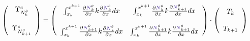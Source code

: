 \[
\left(
\begin{array}{cc}
 {\Upsilon}_{N_k^\theta}^e \\ \\ {\Upsilon}_{N_{k+1}^\theta}^e
\end{array}
\right)
=
\left(
\begin{array}{cc}
\int_{x_k}^{x^{k+1}} \frac{\partial {\color{Violet}N}_k^\theta}{\partial x} k \frac{\partial  {\color{Violet}N}_{k}^\theta } {\partial x}  dx & 
\int_{x_k}^{x^{k+1}} \frac{\partial {\color{Violet}N}_k^\theta}{\partial x} k \frac{\partial  {\color{Violet}N}_{k+1}^\theta } {\partial x} dx 
\\ \\
\int_{x_k}^{x^{k+1}} \frac{\partial {\color{Violet}N}_{k+1}^\theta}{\partial x} k \frac{\partial  {\color{Violet}N}_{k}^\theta } {\partial x}  dx & 
\int_{x_k}^{x^{k+1}} \frac{\partial {\color{Violet}N}_{k+1}^\theta}{\partial x} k \frac{\partial  {\color{Violet}N}_{k+1}^\theta } {\partial x} dx 
\end{array}
\right)
\cdot
\left(
\begin{array}{c}
T_k \\ \\ T_{k+1}
\end{array}
\right)
\]

